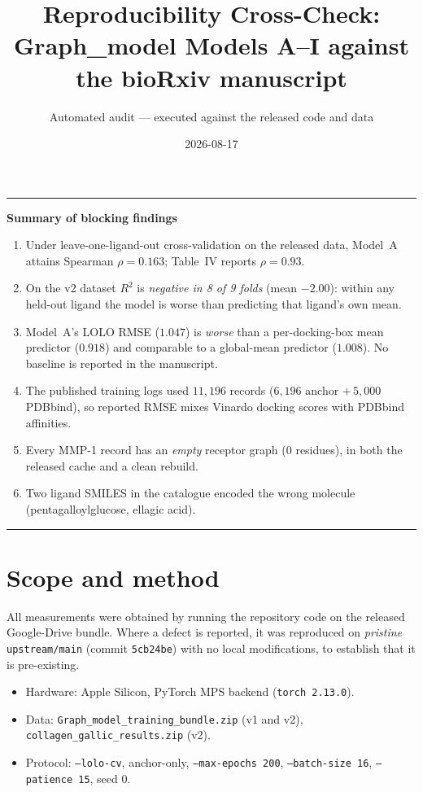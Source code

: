 \documentclass[11pt,a4paper]{article}
\title{Reproducibility Cross-Check:\\
       \large Graph\_model Models A--I against the bioRxiv manuscript}
\author{Automated audit --- executed against the released code and data}
\date{2026-08-17}
\newcommand{\code}[1]{\texttt{\small #1}}
\newenvironment{callout}[1]{%
  \par\medskip\noindent
  \begin{minipage}{\linewidth}%
  \rule{\linewidth}{1.2pt}\par\smallskip
  \textbf{#1}\par\smallskip
}{%
  \par\smallskip\rule{\linewidth}{0.6pt}%
  \end{minipage}\par\medskip
}
\begin{document}
\sloppy
\maketitle

\begin{callout}{Summary of blocking findings}
\begin{enumerate}\itemsep2pt
  \item Under leave-one-ligand-out cross-validation on the released data,
        Model~A attains Spearman $\rho = 0.163$; Table~IV reports $\rho = 0.93$.
  \item On the v2 dataset $R^2$ is \emph{negative in 8 of 9 folds}
        (mean $-2.00$): within any held-out ligand the model is worse than
        predicting that ligand's own mean.
  \item Model~A's LOLO RMSE ($1.047$) is \emph{worse} than a per-docking-box
        mean predictor ($0.918$) and comparable to a global-mean predictor
        ($1.008$). No baseline is reported in the manuscript.
  \item The published training logs used $11{,}196$ records
        ($6{,}196$ anchor $+\,5{,}000$ PDBbind), so reported RMSE mixes Vinardo
        docking scores with PDBbind affinities.
  \item Every MMP-1 record has an \emph{empty} receptor graph (0 residues),
        in both the released cache and a clean rebuild.
  \item Two ligand SMILES in the catalogue encoded the wrong molecule
        (pentagalloylglucose, ellagic acid).
\end{enumerate}
\end{callout}

\section{Scope and method}

All measurements were obtained by running the repository code on the
released Google-Drive bundle. Where a defect is reported, it was
reproduced on \emph{pristine} \code{upstream/main} (commit \code{5cb24be})
with no local modifications, to establish that it is pre-existing.

\begin{itemize}\itemsep1pt
  \item Hardware: Apple Silicon, PyTorch MPS backend (\code{torch 2.13.0}).
  \item Data: \code{Graph\_model\_training\_bundle.zip} (v1 and v2),
        \code{collagen\_gallic\_results.zip} (v2).
  \item Protocol: \code{--lolo-cv}, anchor-only, \code{--max-epochs 200},
        \code{--batch-size 16}, \code{--patience 15}, seed 0.
\end{itemize}
\end{document}
